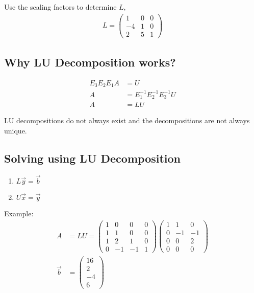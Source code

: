 \noindent
Use the scaling factors to determine \(L\),
\begin{align}
    L = \begin{pmatrix}
        1 & 0 & 0 \\
        -4  & 1 & 0 \\
        2 & 5 & 1
    \end{pmatrix}
\end{align}

\subsection{Why LU Decomposition works?}
\begin{align}
    E_3 E_2 E_1 A &= U \\
    A &= E_1^{-1} E_2^{-1} E_3^{-1} U \\
    A &= L U
\end{align}

\noindent
\newline
LU decompositions do not always exist and the decompositions are not always unique.

\subsection{Solving using LU Decomposition}
\begin{enumerate}
    \item \(L\Vec{y}=\Vec{b}\)
    \item \(U\Vec{x}=\Vec{y}\)
\end{enumerate}

\noindent
\newline
Example:
\begin{align}
    A &= LU = \begin{pmatrix}
        1 & 0 & 0 & 0 \\
        1 & 1 & 0 & 0 \\
        1 & 2 & 1 & 0 \\
        0 & -1 & -1 & 1
    \end{pmatrix}\begin{pmatrix}
        1 & 1 & 0 \\
        0 & -1 & -1 \\
        0 & 0 & 2 \\
        0 & 0 & 0
    \end{pmatrix} \\
    \Vec{b} &= \begin{pmatrix}
        16 \\ 2 \\ -4 \\6
    \end{pmatrix}
\end{align}

